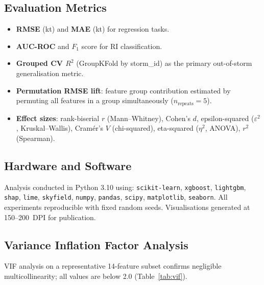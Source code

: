 \documentclass[12pt,a4paper]{article}
\begin{document}
\subsection{Evaluation Metrics}

\begin{itemize}[noitemsep]
  \item \textbf{RMSE} (kt) and \textbf{MAE} (kt) for regression tasks.
  \item \textbf{AUC-ROC} and $F_1$ score for RI classification.
  \item \textbf{Grouped CV $R^2$} (GroupKFold by storm\_id) as the primary
        out-of-storm generalisation metric.
  \item \textbf{Permutation RMSE lift}: feature group contribution estimated
        by permuting all features in a group simultaneously ($n_{\text{repeats}} = 5$).
  \item \textbf{Effect sizes}: rank-biserial $r$ (Mann--Whitney), Cohen's $d$,
        epsilon-squared ($\varepsilon^2$, Kruskal--Wallis), Cram\'er's $V$
        (chi-squared), eta-squared ($\eta^2$, ANOVA), $r^2$ (Spearman).
\end{itemize}

\subsection{Hardware and Software}

Analysis conducted in Python 3.10 using: \texttt{scikit-learn}, \texttt{xgboost},
\texttt{lightgbm}, \texttt{shap}, \texttt{lime}, \texttt{skyfield},
\texttt{numpy}, \texttt{pandas}, \texttt{scipy}, \texttt{matplotlib},
\texttt{seaborn}. All experiments reproducible with fixed random seeds.
Visualisations generated at 150--200~DPI for publication.

\subsection{Variance Inflation Factor Analysis}

VIF analysis on a representative 14-feature subset confirms negligible
multicollinearity; all values are below 2.0 (Table~\ref{tab:vif}).
\end{document}
